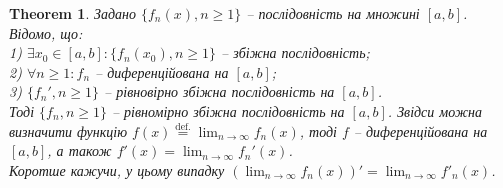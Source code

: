 \documentclass[a4paper, 10pt]{article}
\def\huge{\displaystyle}
\theoremstyle{theoremdd}
\newtheorem{theorem}{Theorem}[subsection]
\theoremstyle{theoremdd}
\theoremstyle{theoremdd}
\theoremstyle{theoremdd}
\theoremstyle{theoremdd}
\theoremstyle{theoremdd}
\theoremstyle{theoremdd}
\theoremstyle{theoremdd}
\theoremstyle{theoremdd}
\begin{document}
\begin{theorem}
Задано $\{f_n(x), n \geq 1\}$ -- послідовність на множині $[a,b]$. Відомо, що:\\
1) $\exists x_0 \in [a,b]: \{f_n(x_0), n \geq 1\}$ -- збіжна послідовність;\\
2) $\forall n \geq 1: f_n$ -- диференційована на $[a,b]$;\\
3) $\{f_n', n \geq 1\}$ -- рівновірно збіжна послідовність на $[a,b]$. \iffalse $f_n'(x)^\rightarrow_\rightarrow f'(x), n \to \infty$. \fi \\
\iffalse
Тоді $f_n(x)^\rightarrow_\rightarrow f(x), n \to \infty$ та $f$ - диференційована на $[a,b]$, а також $f'(x) = \huge\lim_{n \to \infty} f_n'(x)$.
\fi
Тоді $\{f_n, n \geq 1\}$ -- рівномірно збіжна послідовність на $[a,b]$. Звідси можна визначити функцію $f(x) \overset{\text{def.}}{=} \displaystyle\lim_{n \to \infty} f_n(x)$, тоді $f$ -- диференційована на $[a,b]$, а також $f'(x) = \displaystyle\lim_{n \to \infty} f_n'(x)$.\\
Коротше кажучи, у цьому випадку $\displaystyle\left( \lim_{n \to \infty} f_n(x) \right)' = \lim_{n \to \infty} f'_n(x)$.
\end{theorem}
\end{document}
